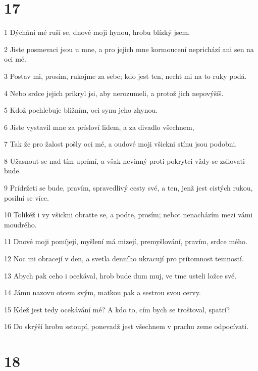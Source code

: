 \chapter{17}

\par 1 Dýchání mé ruší se, dnové moji hynou, hrobu blízký jsem.
\par 2 Jiste posmevaci jsou u mne, a pro jejich mne kormoucení neprichází ani sen na oci mé.
\par 3 Postav mi, prosím, rukojme za sebe; kdo jest ten, necht mi na to ruky podá.
\par 4 Nebo srdce jejich prikryl jsi, aby nerozumeli, a protož jich nepovýšíš.
\par 5 Kdož pochlebuje bližním, oci synu jeho zhynou.
\par 6 Jiste vystavil mne za prísloví lidem, a za divadlo všechnem,
\par 7 Tak že pro žalost pošly oci mé, a oudové moji všickni stínu jsou podobni.
\par 8 Užasnout se nad tím uprímí, a však nevinný proti pokrytci vždy se zsilovati bude.
\par 9 Prídržeti se bude, pravím, spravedlivý cesty své, a ten, jenž jest cistých rukou, posilní se více.
\par 10 Tolikéž i vy všickni obratte se, a podte, prosím; nebot nenacházím mezi vámi moudrého.
\par 11 Dnové moji pomíjejí, myšlení má mizejí, premyšlování, pravím, srdce mého.
\par 12 Noc mi obracejí v den, a svetla denního ukracují pro prítomnost temností.
\par 13 Abych pak ceho i ocekával, hrob bude dum muj, ve tme usteli ložce své.
\par 14 Jámu nazovu otcem svým, matkou pak a sestrou svou cervy.
\par 15 Kdež jest tedy ocekávání mé? A kdo to, cím bych se troštoval, spatrí?
\par 16 Do skrýší hrobu sstoupí, ponevadž jest všechnem v prachu zeme odpocívati.

\chapter{18}

